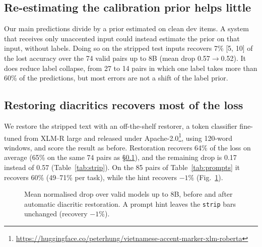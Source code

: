\documentclass[conference]{IEEEtran}
\begin{document}
\subsection{Re-estimating the calibration prior helps little}\label{sec:prior}
Our main predictions divide by a prior estimated on clean dev items. A system that receives only unaccented input could instead estimate the prior on that input, without labels. Doing so on the stripped test inputs recovers 7\% [5, 10] of the lost accuracy over the 74 valid pairs up to 8B (mean drop 0.57$\rightarrow$0.52). It does reduce label collapse, from 27 to 14 pairs in which one label takes more than 60\% of the predictions, but most errors are not a shift of the label prior.

\subsection{Restoring diacritics recovers most of the loss}
We restore the stripped text with an off-the-shelf restorer, a token classifier fine-tuned from XLM-R large and released under Apache-2.0\footnote{\url{https://huggingface.co/peterhung/vietnamese-accent-marker-xlm-roberta}}, using 120-word windows, and score the result as before. Restoration recovers 64\% of the loss on average (65\% on the same 74 pairs as \S\ref{sec:prior}), and the remaining drop is 0.17 instead of 0.57 (Table~\ref{tab:strip}). On the 85 pairs of Table~\ref{tab:prompts} it recovers 60\% (49--71\% per task), while the hint recovers $-1\%$ (Fig.~\ref{fig:fix}).

\begin{figure}[t]
\centering
{}
\caption{Mean normalised drop over valid models up to 8B, before and after automatic diacritic restoration. A prompt hint leaves the \texttt{strip} bars unchanged (recovery $-1\%$).}
\label{fig:fix}
\end{figure}
\end{document}
